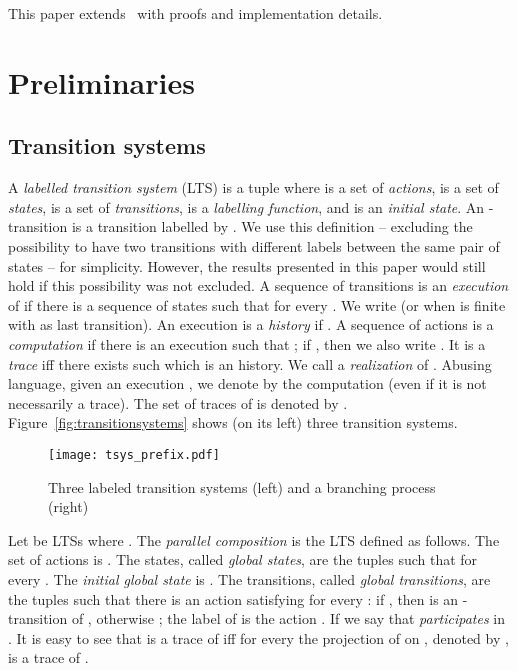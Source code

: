 \documentclass{llncs}
\begin{document}
This paper extends~\cite{Esparza13} with proofs and implementation details.

\section{Preliminaries}

\subsection{Transition systems}

A \emph{labelled transition system} (LTS) is a tuple  where  
is a set of \emph{actions},  is a set of \emph{states}, 
 is a set of \emph{transitions}, 
is a {\em labelling function}, and  is an \emph{initial state}. 
An -transition
is a transition labelled by . 
We use this definition -- excluding the possibility to have two transitions with different labels between the same pair of states -- for simplicity. 
However, the results presented in this paper would still hold if this possibility was not excluded.
A sequence of transitions  is an \emph{execution} of  if there
is a sequence  of states such that  
for every . We write  (or  when  is finite with  as last transition). An execution 
is a \emph{history} if . 
A sequence  
of actions is a \emph{computation} if there is an execution 
such that ; if , 
then we also write . 
It is a \emph{trace} if{}f there exists such  which is an history.
We call  a \emph{realization} of .
Abusing language, given an execution , we denote by  the 
computation  (even if it is not necessarily a trace).
The set of traces 
of  is denoted by .
Figure~\ref{fig:transitionsystems} shows (on its left) three transition systems. 

\begin{figure}[htbp]
\centering
\texttt{[image: tsys\_prefix.pdf]}
\caption{Three labeled transition systems (left) and a branching process (right)}\label{fig:transitionsystems}\label{fig:petrinet}\label{fig:unfolding}
\end{figure}


Let  be LTSs where . 
The {\em parallel composition}   is the LTS 
defined as follows. The set of actions
is . The states, called \emph{global states}, are the tuples  
 such that  for every . 
The \emph{initial global state} is . The transitions, called {\em global transitions},
are the tuples  such that there is an action  satisfying 
 for every : if , then  is an -transition of ,
otherwise ; the label of  is the action . 
If  we say that  \emph{participates} in . 
It is easy to see that  is a trace of  if{}f for every  the projection of  on , denoted by , is a trace of .
\end{document}
